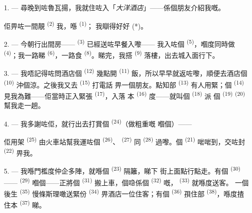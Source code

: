 1. --- 尋晚到咗魯瓦揚，我就住咗入「\textit{大洋酒店}」——係個朋友介紹我嘅。

佢畀咗一間靚 \textsuperscript{(2)} 我，喺 \textsuperscript{(1)}；
我瞓得好好 (*)。

2. --- 今朝行出間房—— \textsuperscript{(3)} 已經送咗早餐入嚟——
我入咗個 \textsuperscript{(5)}，嗰度同時做
\textsuperscript{(4)}；我一路睇 \textsuperscript{(6)}，一路食
 \textsuperscript{(8)}。睇完，我搭 \textsuperscript{(9)} 落樓，出去城入面行下。

3. --- 我唔記得咗問酒店個 \textsuperscript{(12)} 幾點開
\textsuperscript{(11)} 飯，所以早早就返咗嚟，順便去酒店個
\textsuperscript{(10)} 沖個涼。之後我又去 \textsuperscript{(15)} 打電話
畀一個朋友。點知部 \textsuperscript{(13)} 有人用緊；個
\textsuperscript{(14)} 見我為難——佢當時正入緊張 \textsuperscript{(17)}，入落
本 \textsuperscript{(16)} 度——就叫個 \textsuperscript{(18)} 派
個 \textsuperscript{(19)}  \textsuperscript{(20)} 幫我走一趟。

4. --- 我多謝咗佢，就行出去打賞個 \textsuperscript{(24)}（做粗重嘅
嗰個）——

佢用架 \textsuperscript{(25)} 由火車站幫我運咗個
\textsuperscript{(26)}、 \textsuperscript{(27)} 同
\textsuperscript{(28)} 過嚟。個 \textsuperscript{(21)} 啱啱到，交咗封
 \textsuperscript{(22)} 畀我。

5. --- 我喺門檻度仲企多陣，就喺個 \textsuperscript{(23)} 隔籬，睇下
街上面點行點走。有個 \textsuperscript{(30)}——
\textsuperscript{(29)} 嗰個——正將個 \textsuperscript{(31)} 搬上車，個喼係個
 \textsuperscript{(32)} 嘅， \textsuperscript{(33)} 就喺度送客。
一個後生 \textsuperscript{(35)} 慢條斯理噉送緊份
\textsuperscript{(34)} 畀酒店一位住客；有個 \textsuperscript{(36)} 孭住部
 \textsuperscript{(38)}，喺度揸住本 \textsuperscript{(37)} 睇。

\VUsaut{4.0mm}
\VUsaut{3.0mm}

